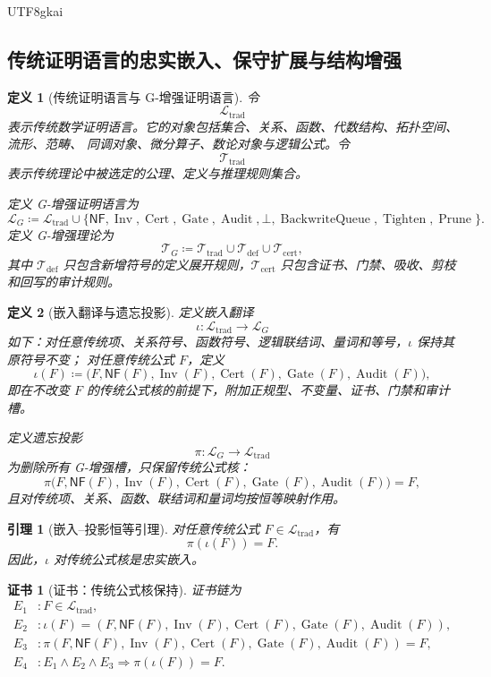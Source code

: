 \documentclass[12pt]{article}
\newtheorem{definition}{定义}[section]
\newtheorem{lemma}{引理}[section]
\newtheorem{Certificate}{证书}[section]
\newcommand{\NF}{\mathsf{NF}}
\newcommand{\DefEq}{\coloneqq}
\DeclareMathOperator{\Cert}{Cert}
\DeclareMathOperator{\Audit}{Audit}
\DeclareMathOperator{\Gate}{Gate}
\DeclareMathOperator{\Inv}{Inv}
\DeclareMathOperator{\BackwriteQueue}{BackwriteQueue}
\DeclareMathOperator{\Tighten}{Tighten}
\DeclareMathOperator{\Prune}{Prune}
\begin{document}
\begin{CJK*}{UTF8}{gkai}
\subsection{传统证明语言的忠实嵌入、保守扩展与结构增强}
\label{subsec:tex59-conservative-enhancement}

\begin{definition}[传统证明语言与 G-增强证明语言]
\label{def:tex59-traditional-and-g-language}
令
\[
  \mathcal L_{\mathrm{trad}}
\]
表示传统数学证明语言。它的对象包括集合、关系、函数、代数结构、拓扑空间、流形、范畴、
同调对象、微分算子、数论对象与逻辑公式。令
\[
  \mathcal T_{\mathrm{trad}}
\]
表示传统理论中被选定的公理、定义与推理规则集合。

定义 G-增强证明语言为
\[
  \mathcal L_G
  \DefEq
  \mathcal L_{\mathrm{trad}}
  \cup
  \{\NF,\Inv,\Cert,\Gate,\Audit,\bot,\BackwriteQueue,\Tighten,\Prune\}.
\]
定义 G-增强理论为
\[
  \mathcal T_G
  \DefEq
  \mathcal T_{\mathrm{trad}}
  \cup
  \mathcal T_{\mathrm{def}}
  \cup
  \mathcal T_{\mathrm{cert}},
\]
其中 \(\mathcal T_{\mathrm{def}}\) 只包含新增符号的定义展开规则，\(\mathcal T_{\mathrm{cert}}\)
只包含证书、门禁、吸收、剪枝和回写的审计规则。
\end{definition}

\begin{definition}[嵌入翻译与遗忘投影]
\label{def:tex59-embedding-projection}
定义嵌入翻译
\[
  \iota:\mathcal L_{\mathrm{trad}}\longrightarrow\mathcal L_G
\]
如下：对任意传统项、关系符号、函数符号、逻辑联结词、量词和等号，\(\iota\) 保持其原符号不变；
对任意传统公式 \(F\)，定义
\[
  \iota(F)
  \DefEq
  \bigl(F,\NF(F),\Inv(F),\Cert(F),\Gate(F),\Audit(F)\bigr),
\]
即在不改变 \(F\) 的传统公式核的前提下，附加正规型、不变量、证书、门禁和审计槽。

定义遗忘投影
\[
  \pi:\mathcal L_G\longrightarrow\mathcal L_{\mathrm{trad}}
\]
为删除所有 G-增强槽，只保留传统公式核：
\[
  \pi\bigl(F,\NF(F),\Inv(F),\Cert(F),\Gate(F),\Audit(F)\bigr)=F,
\]
且对传统项、关系、函数、联结词和量词均按恒等映射作用。
\end{definition}

\begin{lemma}[嵌入--投影恒等引理]
\label{lem:tex59-embedding-projection-identity}
对任意传统公式 \(F\in\mathcal L_{\mathrm{trad}}\)，有
\[
  \pi(\iota(F))=F.
\]
因此，\(\iota\) 对传统公式核是忠实嵌入。
\end{lemma}

\begin{Certificate}[证书：传统公式核保持]
\label{cert:tex59-embedding-projection-identity}
证书链为
\[
\begin{aligned}
  E_1 &: F\in\mathcal L_{\mathrm{trad}},\\
  E_2 &: \iota(F)=
         (F,\NF(F),\Inv(F),\Cert(F),\Gate(F),\Audit(F)),\\
  E_3 &: \pi(F,\NF(F),\Inv(F),\Cert(F),\Gate(F),\Audit(F))=F,\\
  E_4 &: E_1\wedge E_2\wedge E_3
         \Rightarrow
         \pi(\iota(F))=F.
\end{aligned}
\]
\end{Certificate}


\end{CJK*}
\end{document}
